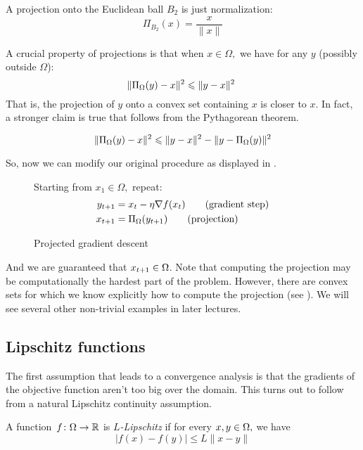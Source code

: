 \begin{example}
A projection onto the Euclidean ball $B_2$ is just normalization:
\[
\Pi_{B_2}(x) = \dfrac{x}{\|x\|}
\]
\end{example}
%
A crucial property of projections is that when $x\in\Omega,$ we have for any $y$
(possibly outside $\Omega$):
\[
\| \Pi_{\Omega}(y) - x \|^2 \leqslant \| y - x \|^2\
\]
That is, the projection of $y$ onto a convex set containing $x$ is closer to
$x$. In fact, a stronger claim is true that follows from the
Pythagorean theorem.
%
\begin{lemma}
\[
\| \Pi_{\Omega}(y) - x \|^2 \leqslant \| y - x \|^2 - \| y - \Pi_{\Omega}(y) \|^2
\]
\end{lemma}

So, now we can modify our original procedure as displayed in
.
\begin{figure}[h]
\begin{center}
\begin{boxedminipage}{0.85\textwidth}
Starting from $x_1\in\Omega,$ repeat:
\begin{align*}
y_{t+1} &= x_t - \eta \nabla f(x_t) \tag{gradient step} \\
x_{t+1} &= \Pi_{\Omega}(y_{t+1}) \tag{projection}
\end{align*}
\end{boxedminipage}
\end{center}
\caption{Projected gradient descent}
\end{figure}

And we are guaranteed that $x_{t+1}\in\Omega$. Note that computing the
projection may be computationally the hardest part of the problem.
However, there are convex sets for which we know explicitly how to
compute the projection (see \exampleref{euclidean-ball}). We will see several
other non-trivial examples in later lectures.

\subsection{Lipschitz functions}

The first assumption that leads to a convergence analysis is that the gradients
of the objective function aren't too big over the domain. This turns out to
follow from a natural Lipschitz continuity assumption.

\begin{definition}[$L$-Lipschitz]
A function~$f\colon\Omega\to\mathbb{R}$ is \emph{$L$-Lipschitz} if for every
$x,y\in\Omega,$ we have
\[
|f(x) - f(y)| \leq L \|x - y\|
\]
\end{definition}

